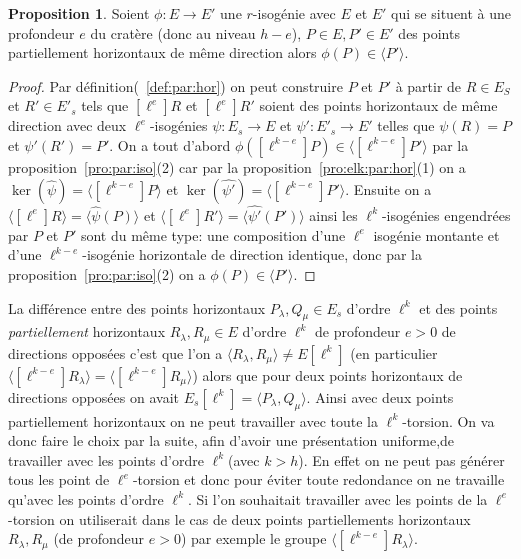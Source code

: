 \documentclass[10pt,a4paper]{book}
\theoremstyle{plain}
\theoremstyle{definition}
\theoremstyle{definition}
\theoremstyle{definition}
\newtheorem{prop}[thm]{Proposition}
\theoremstyle{definition}
\theoremstyle{remark}
\theoremstyle{remark}
\theoremstyle{definition}
\begin{document}
\begin{prop}
\label{pro:par:hor:par}
Soient $\phi: E \rightarrow E'$ une $r$-isogénie avec $E$ et $E'$ qui se
situent à une profondeur $e$ du cratère (donc au niveau $h-e$), $P \in E,P' \in
E'$ des points partiellement horizontaux de même direction alors $\phi(P) \in 
\langle P' \rangle$. 
\end{prop}

\begin{proof}
Par définition(~\ref{def:par:hor}) on peut construire $P$ et $P'$ à 
partir de $R \in E_S$ et $R' \in E'_s$ tels que $[\ell^e]R$ et $[\ell^e]R'$ 
soient des points horizontaux de même direction avec deux $\ell^e$-isogénies 
$\psi:E_s \rightarrow E$ et $\psi':E'_s \rightarrow E'$ telles que $\psi(R)=P$ 
et $\psi'(R')=P'$. On a tout d'abord $ \phi([\ell^{k-e}]P) \in \langle 
[\ell^{k-e}]P' \rangle$  par la proposition~\ref{pro:par:iso}(2) car par la 
proposition~\ref{pro:elk:par:hor}(1) on a $\ker(\widehat{\psi})= \langle 
[\ell^{k-e}]P \rangle$ et $\ker(\widehat{\psi'})= \langle [\ell^{k-e}]P' 
\rangle$. Ensuite on a $\langle [\ell^e]R \rangle = \langle 
\widehat{\psi}(P) \rangle $ et $\langle [\ell^e]R' \rangle = \langle 
\widehat{\psi'}(P') \rangle$ ainsi les $\ell^{k}$-isogénies engendrées par 
$P$ et $P'$ sont du même type: une composition d'une $\ell^e$ isogénie montante 
et d'une $\ell^{k-e}$-isogénie horizontale de direction identique, donc par la 
proposition~\ref{pro:par:iso}(2) on a $\phi(P) \in \langle P' \rangle$.
\end{proof}


La différence entre des points horizontaux $P_{\lambda}, Q_{\mu} \in E_s$ 
d'ordre $\ell^k$ et des points \emph{partiellement} horizontaux $R_{\lambda}, 
R_{\mu} \in E$ d'ordre $\ell^k$ de profondeur $e>0$ de directions opposées 
c'est que l'on a $\langle R_{\lambda}, R_{\mu} \rangle \neq E[\ell^k]$ (en 
particulier$\langle [\ell^{k-e}]R_{\lambda} \rangle = \langle 
[\ell^{k-e}]R_{\mu} \rangle$) alors que pour deux points horizontaux de 
directions opposées on avait $E_s[\ell^k]= \langle P_{\lambda}, Q_{\mu} \rangle$. 
Ainsi avec deux points partiellement horizontaux on ne peut travailler avec 
toute la $\ell^k$-torsion. On va donc faire le choix par la suite, afin d'avoir
une présentation uniforme,de travailler avec les points d'ordre $\ell^k$(avec 
$k>h$). En effet on ne peut pas générer tous les point de $\ell^e$-torsion et 
donc pour éviter toute redondance on ne travaille qu'avec les points d'ordre 
$\ell^k$. Si l'on souhaitait travailler avec les points de la $\ell^e$-torsion 
on utiliserait dans le cas de deux points partiellements horizontaux 
$R_{\lambda}, R_{\mu}$ (de profondeur $e>0$) par exemple le groupe $\langle 
[\ell^{k-e}]R_{\lambda} \rangle$.
\end{document}

